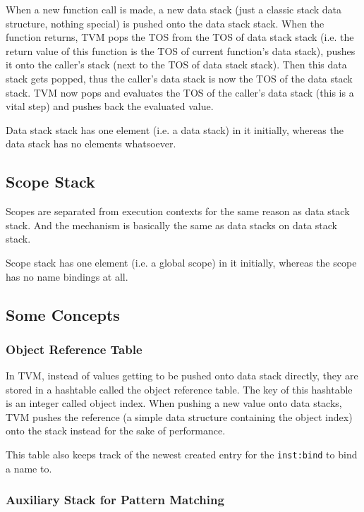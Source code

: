 \documentclass{article}
\newcommand{\inst}[1] {\texttt{inst:#1}}
\begin{document}
When a new function call is made, a new data stack (just a classic stack data structure, nothing special) is pushed onto the data stack stack. When the function returns, TVM pops the TOS from the TOS of data stack stack (i.e. the return value of this function is the TOS of current function's data stack), pushes it onto the caller's stack (next to the TOS of data stack stack). Then this data stack gets popped, thus the caller's data stack is now the TOS of the data stack stack. TVM now pops and evaluates the TOS of the caller's data stack (this is a vital step) and pushes back the evaluated value.

Data stack stack has one element (i.e. a data stack) in it initially, whereas the data stack has no elements whatsoever.

\subsection{Scope Stack}

Scopes are separated from execution contexts for the same reason as data stack stack. And the mechanism is basically the same as data stacks on data stack stack.

Scope stack has one element (i.e. a global scope) in it initially, whereas the scope has no name bindings at all.

\subsection{Some Concepts}

\subsubsection{Object Reference Table}

In TVM, instead of values getting to be pushed onto data stack directly, they are stored in a hashtable called the object reference table. The key of this hashtable is an integer called object index. When pushing a new value onto data stacks, TVM pushes the reference (a simple data structure containing the object index) onto the stack instead for the sake of performance.

This table also keeps track of the newest created entry for the \inst{bind} to bind a name to.

\subsubsection{Auxiliary Stack for Pattern Matching}
\end{document}
